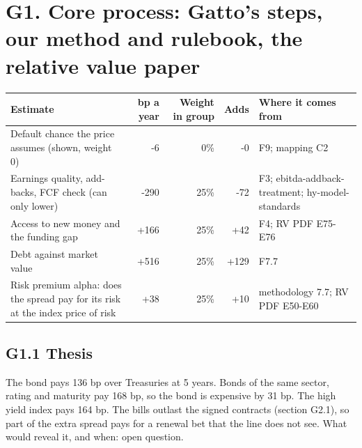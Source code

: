 \documentclass[11pt,a4paper]{article}
\begin{document}
\section*{G1. Core process: Gatto's steps, our method and rulebook, the relative value paper}
\par\noindent{}
\begin{center}\footnotesize\setlength{\tabcolsep}{3.5pt}\begin{tabular}{@{}p{6.2cm}rrrp{4.2cm}@{}}\toprule
Estimate & bp a year & Weight in group & Adds & Where it comes from \\\midrule
Default chance the price assumes (shown, weight 0) & -6 & 0\% & -0 & F9; mapping C2 \\
Earnings quality, add-backs, FCF check (can only lower) & -290 & 25\% & -72 & F3; ebitda-addback-treatment; hy-model-standards \\
Access to new money and the funding gap & +166 & 25\% & +42 & F4; RV PDF E75-E76 \\
Debt against market value & +516 & 25\% & +129 & F7.7 \\
Risk premium alpha: does the spread pay for its risk at the index price of risk & +38 & 25\% & +10 & methodology 7.7; RV PDF E50-E60 \\
\bottomrule\end{tabular}\end{center}
\subsection*{G1.1 Thesis}
The bond pays 136 bp over Treasuries at 5 years. Bonds of the same sector, rating and maturity pay 168 bp, so the bond is expensive by 31 bp. The high yield index pays 164 bp. The bills outlast the signed contracts (section G2.1), so part of the extra spread pays for a renewal bet that the line does not see. What would reveal it, and when: open question.
\end{document}
